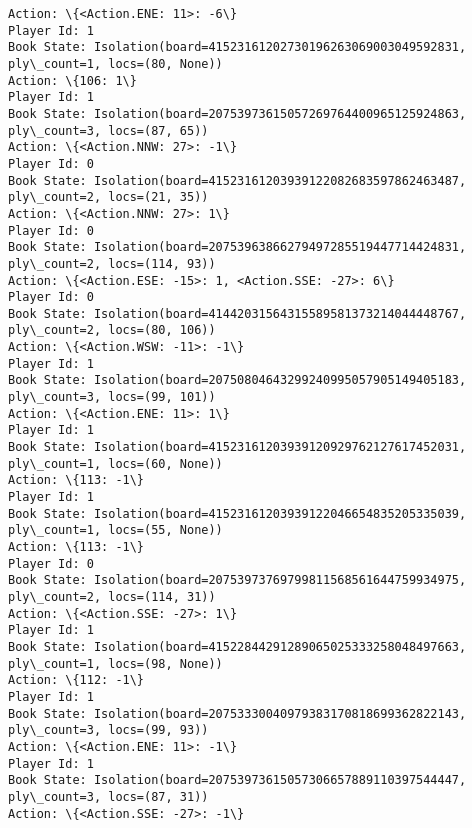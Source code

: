 \documentclass[11pt]{article}
\begin{document}
\begin{Verbatim}[commandchars=\\\{\}]
Action: \{<Action.ENE: 11>: -6\}
Player Id: 1
Book State: Isolation(board=41523161202730196263069003049592831, ply\_count=1, locs=(80, None))
Action: \{106: 1\}
Player Id: 1
Book State: Isolation(board=20753973615057269764400965125924863, ply\_count=3, locs=(87, 65))
Action: \{<Action.NNW: 27>: -1\}
Player Id: 0
Book State: Isolation(board=41523161203939122082683597862463487, ply\_count=2, locs=(21, 35))
Action: \{<Action.NNW: 27>: 1\}
Player Id: 0
Book State: Isolation(board=20753963866279497285519447714424831, ply\_count=2, locs=(114, 93))
Action: \{<Action.ESE: -15>: 1, <Action.SSE: -27>: 6\}
Player Id: 0
Book State: Isolation(board=41442031564315589581373214044448767, ply\_count=2, locs=(80, 106))
Action: \{<Action.WSW: -11>: -1\}
Player Id: 1
Book State: Isolation(board=20750804643299240995057905149405183, ply\_count=3, locs=(99, 101))
Action: \{<Action.ENE: 11>: 1\}
Player Id: 1
Book State: Isolation(board=41523161203939120929762127617452031, ply\_count=1, locs=(60, None))
Action: \{113: -1\}
Player Id: 1
Book State: Isolation(board=41523161203939122046654835205335039, ply\_count=1, locs=(55, None))
Action: \{113: -1\}
Player Id: 0
Book State: Isolation(board=20753973769799811568561644759934975, ply\_count=2, locs=(114, 31))
Action: \{<Action.SSE: -27>: 1\}
Player Id: 1
Book State: Isolation(board=41522844291289065025333258048497663, ply\_count=1, locs=(98, None))
Action: \{112: -1\}
Player Id: 1
Book State: Isolation(board=20753330040979383170818699362822143, ply\_count=3, locs=(99, 93))
Action: \{<Action.ENE: 11>: -1\}
Player Id: 1
Book State: Isolation(board=20753973615057306657889110397544447, ply\_count=3, locs=(87, 31))
Action: \{<Action.SSE: -27>: -1\}


\end{Verbatim}
\end{document}
